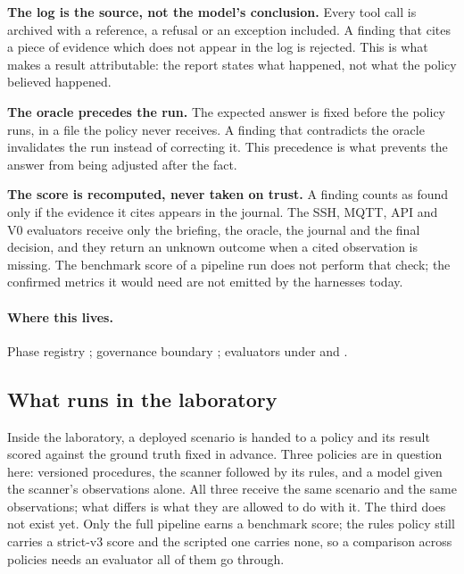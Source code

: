 \textbf{The log is the source, not the model's conclusion.} Every tool call is
archived with a reference, a refusal or an exception included. A finding that
cites a piece of evidence which does not appear in the log is rejected. This is
what makes a result attributable: the report states what happened, not what the
policy believed happened.

\textbf{The oracle precedes the run.} The expected answer is fixed before the
policy runs, in a file the policy never receives. A finding that contradicts the
oracle invalidates the run instead of correcting it. This precedence is what
prevents the answer from being adjusted after the fact.

\textbf{The score is recomputed, never taken on trust.} A finding counts as found
only if the evidence it cites appears in the journal. The SSH, MQTT, API and V0
evaluators receive only the briefing, the oracle, the journal and the final
decision, and they return an unknown outcome when a cited observation is missing. The benchmark score of a pipeline run does not perform that check; the
confirmed metrics it would need are not emitted by the harnesses today.
\paragraph{Where this lives.}
Phase registry ; governance boundary
; evaluators under  and
.

\subsection{What runs in the laboratory}

Inside the laboratory, a deployed scenario is handed to a policy and its result
scored against the ground truth fixed in advance. Three policies are
in question here: versioned procedures, the scanner followed by its rules, and a
model given the scanner's observations alone. All three receive the same scenario
and the same observations; what differs is what they are allowed to do with it. The
third does not exist yet. Only the full pipeline earns a benchmark score; the rules
policy still carries a strict-v3 score and the scripted one carries none, so a
comparison across policies needs an evaluator all of them go through.

